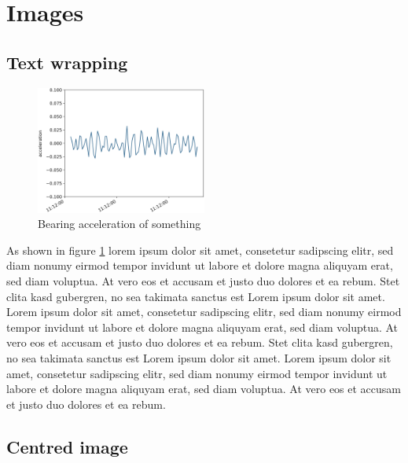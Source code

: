 \section{Images}
\label{sec:images}

\subsection{Text wrapping}
\label{sec:images:text_wrapping}

\begin{figure}
  \begin{center}
    \vspace{-1\intextsep}
    \hspace*{-.5\columnsep}
    \includegraphics[width=0.5\textwidth]{Resources/Images/Images/Bearing/bearing_acceleration.png}
  \end{center}
  \caption{Bearing acceleration of something}
  \label{fig:images:acceleration}
\end{figure}

As shown in figure \ref{fig:images:acceleration} lorem ipsum dolor sit amet, consetetur sadipscing elitr, sed diam nonumy eirmod tempor invidunt ut labore et dolore magna aliquyam erat, sed diam voluptua.
At vero eos et accusam et justo duo dolores et ea rebum. Stet clita kasd gubergren, no sea takimata sanctus est Lorem ipsum dolor sit amet.
Lorem ipsum dolor sit amet, consetetur sadipscing elitr, sed diam nonumy eirmod tempor invidunt ut labore et dolore magna aliquyam erat, sed diam voluptua. At vero eos et accusam et justo duo dolores et ea rebum.
Stet clita kasd gubergren, no sea takimata sanctus est Lorem ipsum dolor sit amet. Lorem ipsum dolor sit amet, consetetur sadipscing elitr, sed diam nonumy eirmod tempor invidunt ut labore et dolore magna aliquyam erat, sed diam voluptua.
At vero eos et accusam et justo duo dolores et ea rebum. \cite{example_xy}

\subsection{Centred image}
\label{sec:images:centred_image}

